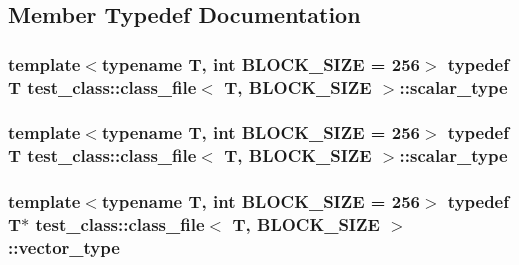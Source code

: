 \subsection{Member Typedef Documentation}
\hypertarget{classtest__class_1_1class__file_a4a1b0b0803393eef737a5af7de611879}{
\subsubsection[{scalar\-\_\-type}]{\setlength{\rightskip}{0pt plus 5cm}template$<$typename T, int B\-L\-O\-C\-K\-\_\-\-S\-I\-Z\-E = 256$>$ typedef T {\bf test\-\_\-class\-::class\-\_\-file}$<$ T, B\-L\-O\-C\-K\-\_\-\-S\-I\-Z\-E $>$\-::{\bf scalar\-\_\-type}}}\label{classtest__class_1_1class__file_a4a1b0b0803393eef737a5af7de611879}
\hypertarget{classtest__class_1_1class__file_a4a1b0b0803393eef737a5af7de611879}{
\subsubsection[{scalar\-\_\-type}]{\setlength{\rightskip}{0pt plus 5cm}template$<$typename T, int B\-L\-O\-C\-K\-\_\-\-S\-I\-Z\-E = 256$>$ typedef T {\bf test\-\_\-class\-::class\-\_\-file}$<$ T, B\-L\-O\-C\-K\-\_\-\-S\-I\-Z\-E $>$\-::{\bf scalar\-\_\-type}}}\label{classtest__class_1_1class__file_a4a1b0b0803393eef737a5af7de611879}
\hypertarget{classtest__class_1_1class__file_abe63b9f832b951bdde090c87f78a92a5}{
\subsubsection[{vector\-\_\-type}]{\setlength{\rightskip}{0pt plus 5cm}template$<$typename T, int B\-L\-O\-C\-K\-\_\-\-S\-I\-Z\-E = 256$>$ typedef T$\ast$ {\bf test\-\_\-class\-::class\-\_\-file}$<$ T, B\-L\-O\-C\-K\-\_\-\-S\-I\-Z\-E $>$\-::{\bf vector\-\_\-type}}}\label{classtest__class_1_1class__file_abe63b9f832b951bdde090c87f78a92a5}

